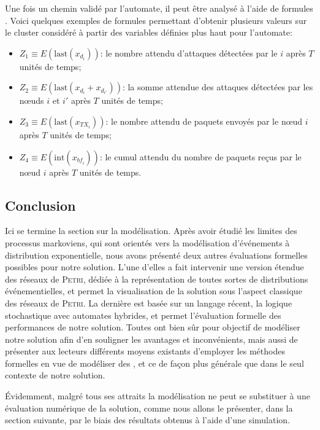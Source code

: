 Une fois un chemin validé par l'automate, il peut être analysé à l'aide de formules \lsah.
Voici quelques exemples de formules \lsah permettant d'obtenir plusieurs valeurs sur le cluster considéré à partir des variables définies plus haut pour l'automate:
\begin{itemize}
    \item $Z_1\equiv E(\mbox{last}(x_{d_i}))$: le nombre attendu d'attaques détectées par le \cn $i$ après $T$ unités de temps;
    \item $Z_2\equiv E(\mbox{last}(x_{d_i}+x_{d_{i'}}))$: la somme attendue des attaques détectées par les nœuds $i$ et $i'$ après $T$ unités de temps;
    \item $Z_3\equiv E(\mbox{last}(x_{\mathit{TX}_i}))$: le nombre attendu de paquets envoyés par le nœud $i$ après $T$ unités de temps;
    \item $Z_4\equiv E(\mbox{int}(x_{\mathit{bf}_i}))$: le cumul attendu du nombre de paquets reçus par le nœud $i$ après $T$ unités de temps.
\end{itemize}

    \subsection{Conclusion}

Ici se termine la section sur la modélisation.
Après avoir étudié les limites des processus markoviens, qui sont orientés vers la modélisation d'événements à distribution exponentielle, nous avons présenté deux autres évaluations formelles possibles pour notre solution.
L'une d'elles a fait intervenir une version étendue des réseaux de \textsc{Petri}, dédiée à la représentation de toutes sortes de distributions événementielles, et permet la visualisation de la solution sous l'aspect classique des réseaux de \textsc{Petri}.
La dernière est basée sur un langage récent, la logique stochastique avec automates hybrides, et permet l'évaluation formelle des performances de notre solution.
Toutes ont bien sûr pour objectif de modéliser notre solution afin d'en souligner les avantages et inconvénients, mais aussi de présenter aux lecteurs différents moyens existants d'employer les méthodes formelles en vue de modéliser des \rcs, et ce de façon plus générale que dans le seul contexte de notre solution.

Évidemment, malgré tous ses attraits la modélisation ne peut se substituer à une évaluation numérique de la solution, comme nous allons le présenter, dans la section suivante, par le biais des résultats obtenus à l'aide d'une simulation.

